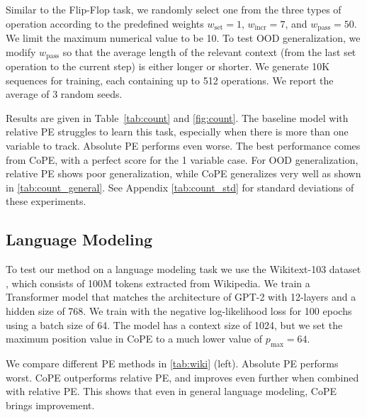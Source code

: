 \documentclass{article}
\newcommand{\ours}{CoPE\xspace}
\begin{document}
Similar to the Flip-Flop task, we randomly select one from the three types of operation according to the predefined weights $w_\text{set}=1$, $w_\text{incr}=7$, and $w_\text{pass}=50$.
We limit the maximum numerical value to be 10.
To test OOD generalization, we modify $w_\text{pass}$ so that the average length of the relevant context (from the last set operation to the current step) is either longer or shorter.
We generate 10K sequences for training, each containing up to 512 operations. We report the average of 3 random seeds.

Results are given in Table~\ref{tab:count} and  \cref{fig:count}.
The baseline model with relative PE struggles to learn this task, especially when there is more than one variable to track.
Absolute PE performs even worse.
The best performance comes from \ours{}, with a perfect score for the 1 variable case.
For OOD generalization,
 relative PE shows poor generalization, while \ours{}  generalizes very well as shown in \cref{tab:count_general}.
See  Appendix \cref{tab:count_std}  for standard deviations of these experiments. 


\subsection{Language Modeling}
To test our method on a language modeling task we use the Wikitext-103 dataset \citep{merity2016pointer}, which consists of 100M tokens extracted from Wikipedia.
We train a Transformer model that matches the architecture of GPT-2 \citep{radford2019language} with 12-layers and a hidden size of 768.
We train with the negative log-likelihood loss for 100 epochs using a batch size of 64.
The model has a context size of 1024, but  we set the maximum position value in \ours{} to a much lower value of $p_\text{max}=64$.

We compare different PE methods in \cref{tab:wiki} (left).
Absolute PE performs worst.
\ours{} outperforms  relative PE, and  improves even further when  combined with relative PE.
This shows that even in general language modeling, \ours{} brings improvement.
\end{document}
